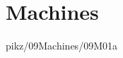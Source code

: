 \documentclass[9pt,xcolor={svgnames, x11names}]{beamer}
\begin{document}
%   


%   


%   



\section{Machines}



\begin{frame}{pikz/09Machines/09M01a}
  
\end{frame}



\end{document}
